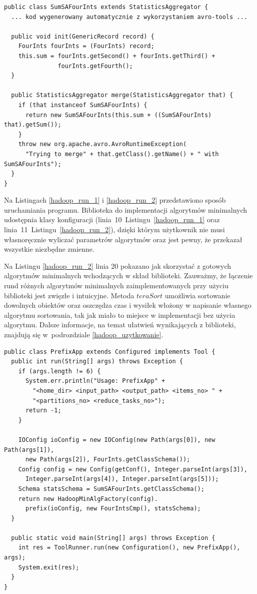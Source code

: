 \documentclass[magisterska]{pracamgr}
\begin{document}
\begin{lstlisting}[language=SmallJava,firstnumber=1,label=hadoop_stats_class,caption=Klasa statystyk na obiektach FourInts]
public class SumSAFourInts extends StatisticsAggregator {
  ... kod wygenerowany automatycznie z wykorzystaniem avro-tools ...

  public void init(GenericRecord record) {
    FourInts fourInts = (FourInts) record;
    this.sum = fourInts.getSecond() + fourInts.getThird() +
               fourInts.getFourth();
  }

  public StatisticsAggregator merge(StatisticsAggregator that) {
    if (that instanceof SumSAFourInts) {
      return new SumSAFourInts(this.sum + ((SumSAFourInts) that).getSum());
    }
    throw new org.apache.avro.AvroRuntimeException(
      "Trying to merge" + that.getClass().getName() + " with SumSAFourInts");
  }
}

\end{lstlisting}

Na Listingach \ref{hadoop_run_1} i \ref{hadoop_run_2} przedstawiono sposób uruchamiania programu. Biblioteka do implementacji algorytmów minimalnych udostępnia klasy konfiguracji (\mbox{linia 10 Listingu \ref{hadoop_run_1}} oraz \mbox{linia 11 Listingu \ref{hadoop_run_2})}, dzięki którym użytkownik nie musi własnoręcznie wyliczać parametrów algorytmów oraz jest pewny, że przekazał wszystkie niezbędne zmienne.

Na Listingu \ref{hadoop_run_2} linia 20 pokazano jak skorzystać z gotowych algorytmów minimalnych wchodzących w skład biblioteki. Zauważmy, że łączenie rund różnych algorytmów minimalnych zaimplementowanych przy użyciu biblioteki jest zwięzłe i intuicyjne. Metoda \(teraSort\) umożliwia sortowanie dowolnych obiektów oraz oszczędza czas i wysiłek włożony w napisanie własnego algorytmu sortowania, tak jak miało to miejsce w implementacji bez użycia algorytmu. Dalsze informacje, na temat ułatwień wynikających z biblioteki, znajdują się w~podrozdziale \ref{hadoop_uzytkowanie}.

\newpage
\begin{lstlisting}[language=SmallJava,firstnumber=1,label=hadoop_run_1,caption=Uruchamianie algorytmu - część 1]
public class PrefixApp extends Configured implements Tool {
  public int run(String[] args) throws Exception {
    if (args.length != 6) {
      System.err.println("Usage: PrefixApp" +
        "<home_dir> <input_path> <output_path> <items_no> " +
        "<partitions_no> <reduce_tasks_no>");
      return -1;
    }

    IOConfig ioConfig = new IOConfig(new Path(args[0]), new Path(args[1]),
      new Path(args[2]), FourInts.getClassSchema());
    Config config = new Config(getConf(), Integer.parseInt(args[3]),
      Integer.parseInt(args[4]), Integer.parseInt(args[5]));
    Schema statsSchema = SumSAFourInts.getClassSchema();
    return new HadoopMinAlgFactory(config).
      prefix(ioConfig, new FourIntsCmp(), statsSchema);
  }

  public static void main(String[] args) throws Exception {
    int res = ToolRunner.run(new Configuration(), new PrefixApp(), args);
    System.exit(res);
  }
}
\end{lstlisting}
\end{document}
